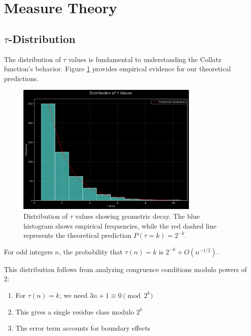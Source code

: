 \section{Measure Theory}\label{sec:measure_theory}

\subsection{$\tau$-Distribution}

The distribution of $\tau$ values is fundamental to understanding the Collatz function's behavior. Figure \ref{fig:tau_distribution} provides empirical evidence for our theoretical predictions.

\begin{figure}[h]
\centering
\includegraphics[width=0.8\textwidth]{figures/tau_distribution.svg}
\caption{Distribution of $\tau$ values showing geometric decay. The blue histogram shows empirical frequencies, while the red dashed line represents the theoretical prediction $P(\tau = k) = 2^{-k}$.}
\label{fig:tau_distribution}
\end{figure}

\begin{theorem}\label{thm:tau_dist}
For odd integers $n$, the probability that $\tau(n) = k$ is $2^{-k} + O(n^{-1/2})$.
\end{theorem}

This distribution follows from analyzing congruence conditions modulo powers of 2:
\begin{enumerate}
\item For $\tau(n) = k$, we need $3n + 1 \equiv 0 \pmod{2^k}$
\item This gives a single residue class modulo $2^k$
\item The error term accounts for boundary effects
\end{enumerate}

